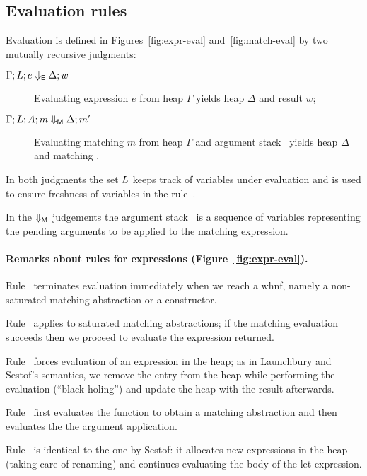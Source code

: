 \subsection{Evaluation rules}

Evaluation is defined in Figures~\ref{fig:expr-eval}
and~\ref{fig:match-eval} by two mutually recursive judgments:
\begin{description}
  \item[$\Gamma;L;e \Downarrow_{\textsf{E}} \Delta;w$]  Evaluating 
   expression $e$ from heap $\Gamma$ yields heap $\Delta$ and result $w$;
  \item[$\Gamma;L;A; m \Downarrow_{\textsf{M}} \Delta;m'$] 
    Evaluating matching $m$ from heap $\Gamma$ and argument stack \argstack\
    yields heap $\Delta$ and matching \matchresult.
  \end{description}

  In both judgments the set $L$ keeps track of variables under
  evaluation and is used to ensure freshness of variables in the
  \bigrule{Let} rule~\cite{sestof_1997}.

  In the $\Downarrow_{\textsf{M}}$ judgements the argument stack \argstack\ is
  a sequence of variables representing the pending arguments
  to be applied to the matching expression.

\paragraph{Remarks about rules for  expressions (Figure~\ref{fig:expr-eval}).}
  
  Rule~ terminates evaluation immediately when we reach a whnf,
  namely a non-saturated matching abstraction or a constructor.
  
  Rule~ applies to saturated matching abstractions;
  if the matching evaluation succeeds then
  we proceed to evaluate the expression returned.
    
  Rule~ forces evaluation of an expression in the heap; as in
  Launchbury and Sestof's semantics, we remove the entry
  from the heap  while performing the evaluation (``black-holing'')
  and update the heap with the result afterwards.
    
  Rule~ first evaluates the function to
  obtain a matching abstraction and then evaluates
  the the argument application.
    
  Rule~ is identical to the one by Sestof: it allocates
  new expressions in the heap (taking care of renaming) and
  continues evaluating the body of the let expression.
  
